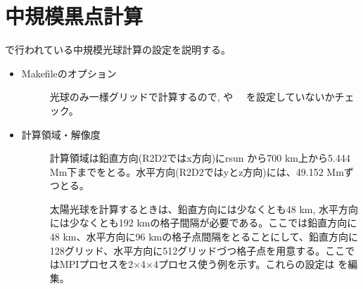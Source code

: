 \documentclass[letterpaper,10pt,dvipdfmx,report]{sphinxmanual}
\begin{document}
\section{中規模黒点計算}
\label{\detokenize{typical_case:id3}}
 で行われている中規模光球計算の設定を説明する。
\begin{itemize}
\item {} \begin{description}
\item[{Makefileのオプション}] \leavevmode
光球のみ一様グリッドで計算するので,  や　 を設定していないかチェック。

\end{description}

\item {} \begin{description}
\item[{計算領域・解像度}] \leavevmode
計算領域は鉛直方向(R2D2ではx方向)にrsun から700 km上から5.444 Mm下までをとる。水平方向(R2D2ではyとz方向)には、49.152 Mmずつとる。

太陽光球を計算するときは、鉛直方向には少なくとも48 km, 水平方向には少なくとも192 kmの格子間隔が必要である。ここでは鉛直方向に48 km、水平方向に96 kmの格子点間隔をとることにして、鉛直方向に128グリッド、水平方向に512グリッドづつ格子点を用意する。ここではMPIプロセスを2×4×4プロセス使う例を示す。これらの設定は  を編集。

\begin{sphinxVerbatim}[commandchars=\\\{\}]
      
      
           
           


\end{sphinxVerbatim}
\end{description}
\end{itemize}
\end{document}
